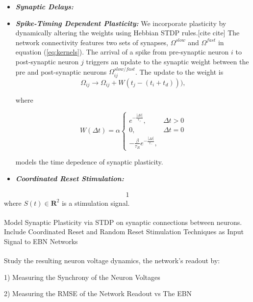 \documentclass{article}
\numberwithin{equation}{section}
\begin{document}
\begin{itemize}
\item \textbf{\textit{Synaptic Delays: }}


\item  \textbf{\textit{Spike-Timing Dependent Plasticity: }} We incorporate plasticity by dynamically altering the weights using Hebbian STDP rules.[cite cite] The network connectivity features two sets of synapses, $\Omega^{slow}$ and $\Omega^{fast}$ in equation (\ref{eq:kernels}). The  arrival of a spike from pre-synaptic neuron $i$ to post-synaptic neuron $j$ triggers an update to the synaptic weight between the pre and post-synaptic neurons $\Omega^{slow/fast}_{ij}$. The update to the weight is
$$
\Omega_{ij} \rightarrow \Omega_{ij} + W(t_j - (t_i + t_d))), 
$$

where

\begin{equation}
W(\Delta t) = \alpha  
\begin{cases}
e^{-\frac{|\Delta t|}{\tau_+}}, & \Delta t > 0
\\
0, & \Delta t = 0
\\
-\frac{\beta}{\tau_R} e^{-\frac{|\Delta t|}{\tau_-}},
\end{cases}
\end{equation}

models the time depedence of synaptic plasticity.

\item \textbf{\textit{Coordinated Reset Stimulation: }}

\end{itemize}





\begin{align}
1
\end{align}
where $S(t) \in \mathbf{R}^2$ is a stimulation signal. 
\\
\\
Model Synaptic Plasticity via STDP on synaptic connections between neurons. 
\\
Include Coordinated Reset and Random Reset Stimulation Techniques as Input Signal to EBN Networks
\\
\\
Study the resulting neuron voltage dynamics, the network's readout by: 
	
	 1) Measuring the Synchrony of the Neuron Voltages  
	 
	 2) Measuring the RMSE of the Network Readout vs The EBN 
	 
	 
	 
\clearpage
\end{document}
